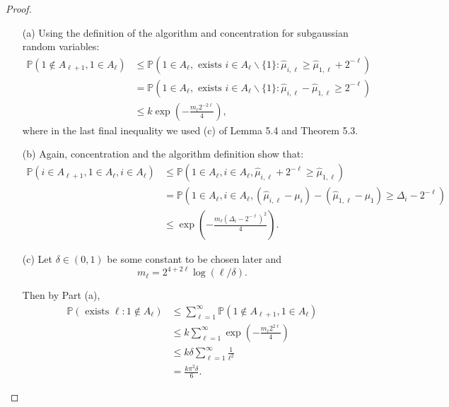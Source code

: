 \begin{proof}
    \begin{enumerate}
        \item[(a)] Using the definition of the algorithm and concentration for subgaussian random variables:
        \begin{equation*}
            \begin{aligned}
                \mathbb{P}\left(1 \notin A_{\ell+1}, 1 \in A_{\ell}\right) & \leq \mathbb{P}\left(1 \in A_{\ell}, \text { exists } i \in A_{\ell} \backslash\{1\}: \hat{\mu}_{i, \ell} \geq \hat{\mu}_{1, \ell}+2^{-\ell}\right) \\
                &=\mathbb{P}\left(1 \in A_{\ell}, \text { exists } i \in A_{\ell} \backslash\{1\}: \hat{\mu}_{i, \ell}-\hat{\mu}_{1, \ell} \geq 2^{-\ell}\right) \\
                & \leq k \exp \left(-\frac{m_{\ell} 2^{-2 \ell}}{4}\right),
            \end{aligned}
        \end{equation*} 
        where in the last final inequality we used (c) of Lemma 5.4 and Theorem 5.3.

        \item[(b)] Again, concentration and the algorithm definition show that:
        \begin{equation*}
            \begin{aligned}
                \mathbb{P}\left(i \in A_{\ell+1}, 1 \in A_{\ell}, i \in A_{\ell}\right) &\leq \mathbb{P}\left(1 \in A_{\ell}, i \in A_{\ell}, \hat{\mu}_{i, \ell}+2^{-\ell} \geq \hat{\mu}_{1, \ell}\right) \\
                &=\mathbb{P}\left(1 \in A_{\ell}, i \in A_{\ell},\left(\hat{\mu}_{i, \ell}-\mu_{i}\right)-\left(\hat{\mu}_{1, \ell}-\mu_{1}\right) \geq \Delta_{i}-2^{-\ell}\right) \\
                & \leq \exp \left(-\frac{m_{\ell}\left(\Delta_{i}-2^{-\ell}\right)^{2}}{4}\right).
            \end{aligned}
        \end{equation*}

        \item[(c)] Let $\delta \in(0,1)$ be some constant to be chosen later and
        $$m_{\ell}=2^{4+2 \ell} \log (\ell / \delta).$$
        
        Then by Part (a),
        \begin{equation*}
            \begin{aligned}
                \mathbb{P}\left(\text { exists } \ell: 1 \notin A_{\ell}\right) & \leq \sum_{\ell=1}^{\infty} \mathbb{P}\left(1 \notin A_{\ell+1}, 1 \in A_{\ell}\right) \\
                & \leq k \sum_{\ell=1}^{\infty} \exp \left(-\frac{m_{\ell} 2^{2 \ell}}{4}\right) \\
                & \leq k \delta \sum_{\ell=1}^{\infty} \frac{1}{\ell^{2}} \\
                &=\frac{k \pi^{2} \delta}{6}.
            \end{aligned}
        \end{equation*}


\end{enumerate}
\end{proof}

